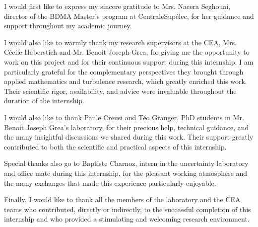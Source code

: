 ﻿I would first like to express my sincere gratitude to Mrs. Nacera Seghouai, director of the BDMA Master's program at CentraleSupélec, for her guidance and support throughout my academic journey.

I would also like to warmly thank my research supervisors at the CEA, Mrs. Cécile Haberstich and Mr. Benoit Joseph Grea, for giving me the opportunity to work on this project and for their continuous support during this internship. I am particularly grateful for the complementary perspectives they brought through applied mathematics and turbulence research, which greatly enriched this work. Their scientific rigor, availability, and advice were invaluable throughout the duration of the internship.

I would also like to thank Paule Creusi and Téo Granger, PhD students in Mr. Benoit Joseph Grea's laboratory, for their precious help, technical guidance, and the many insightful discussions we shared during this work. Their support greatly contributed to both the scientific and practical aspects of this internship.

Special thanks also go to Baptiste Charnoz, intern in the uncertainty laboratory and office mate during this internship, for the pleasant working atmosphere and the many exchanges that made this experience particularly enjoyable.

Finally, I would like to thank all the members of the laboratory and the CEA teams who contributed, directly or indirectly, to the successful completion of this internship and who provided a stimulating and welcoming research environment.
